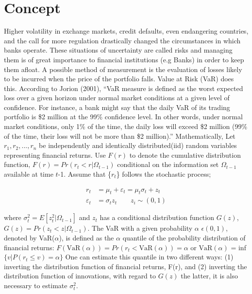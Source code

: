 \documentclass[a4paper,11pt,oneside]{book}
\begin{document}

\section{Concept}
Higher volatility in exchange markets, credit defaults, even endangering countries, and the call for more regulation drastically changed the circumstances in which banks operate. These situations of uncertainty are called risks and managing them is of great importance to financial institutions (e.g Banks) in order to keep them afloat. A possible method of measurement is the evaluation of losses likely to be incurred when the price of the portfolio falls. Value at Risk (VaR) does this.
\newline\newline
According to Jorion (2001), “VaR measure is defined as the worst
expected loss over a given horizon under normal market conditions
at a given level of confidence. For instance, a bank might say that
the daily VaR of its trading portfolio is \$2 million at the 99\%
confidence level. In other words, under normal market conditions,
only 1\% of the time, the daily loss will exceed \$2 million (99\% of the time, their loss will not be more than \$2 million).”
\newline\newline
Mathematically,\newline\newline
Let $r_1, r_2, ..., r_n$ be independently and identically distributed(iid) random variables representing financial returns. Use $F(r)$ to denote the cumulative distribution function,
$F(r) = Pr(r_{t} < r|\Omega_{t-1})$ conditional on the information set $\Omega_{t-1}$ available at time $t$-1. Assume that \{$r_t$\} follows the stochastic process; \newline

\begin{equation}
\begin{aligned}
r_t &= \mu_t + \varepsilon_t =\mu_t \sigma_t + z_t
\\
\varepsilon_t &= \sigma_t  z_t \qquad   z_i \sim (0,1)
\label{1}
\end{aligned}
\end{equation}

where $\sigma^2_t = E[z^2_t|\Omega_{t-1}]$ and $z_t$ has a conditional distribution function $G(z)$, $G(z) = Pr(z_t < z|\Omega_{t-1})$. The VaR with a given probability $\alpha$ $\epsilon(0,1)$, denoted by VaR($\alpha$), is defined as the $\alpha$ quantile of the probability distribution of financial returns:\newline
$F(\text{VaR}(\alpha))=Pr(r_t < \text{VaR}(\alpha))=\alpha$ or $\text{VaR}(\alpha)$ = inf$\{v|P(r_t \leq v)= \alpha\}$
\newline\newline
One can estimate this quantile in two different ways: (1) inverting the distribution function of financial returns, F(r), and (2)
inverting the distribution function of innovations, with regard to
$G(z)$ the latter, it is also necessary to estimate $\sigma^2_t$.
\end{document}
